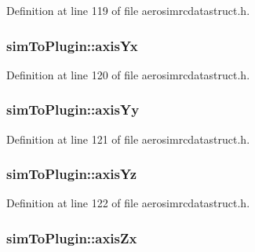 Definition at line 119 of file aerosimrcdatastruct.\-h.

\hypertarget{group___aero_sim_r_c_gab46b6cb491df61bb0808c6a2942f5f26}{
\subsubsection[{axis\-Yx}]{ sim\-To\-Plugin\-::axis\-Yx}}\label{group___aero_sim_r_c_gab46b6cb491df61bb0808c6a2942f5f26}


Definition at line 120 of file aerosimrcdatastruct.\-h.

\hypertarget{group___aero_sim_r_c_gab1c3f18d56d396a6dd95411539ffc0e8}{
\subsubsection[{axis\-Yy}]{ sim\-To\-Plugin\-::axis\-Yy}}\label{group___aero_sim_r_c_gab1c3f18d56d396a6dd95411539ffc0e8}


Definition at line 121 of file aerosimrcdatastruct.\-h.

\hypertarget{group___aero_sim_r_c_ga7c0f6efcd45a801369e92067bc85a5ca}{
\subsubsection[{axis\-Yz}]{ sim\-To\-Plugin\-::axis\-Yz}}\label{group___aero_sim_r_c_ga7c0f6efcd45a801369e92067bc85a5ca}


Definition at line 122 of file aerosimrcdatastruct.\-h.

\hypertarget{group___aero_sim_r_c_gac74b099d24d55ff1692b855313489324}{
\subsubsection[{axis\-Zx}]{ sim\-To\-Plugin\-::axis\-Zx}}\label{group___aero_sim_r_c_gac74b099d24d55ff1692b855313489324}


